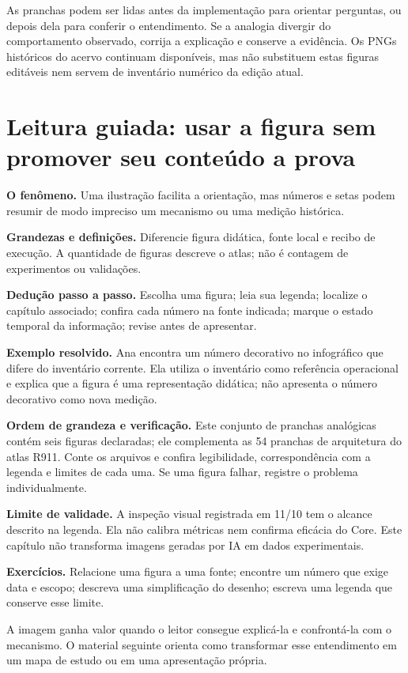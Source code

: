 As pranchas podem ser lidas antes da implementação para orientar perguntas, ou
depois dela para conferir o entendimento. Se a analogia divergir do comportamento
observado, corrija a explicação e conserve a evidência. Os PNGs históricos do
acervo continuam disponíveis, mas não substituem estas figuras editáveis nem
servem de inventário numérico da edição atual.

\section[Leitura guiada]{Leitura guiada: usar a figura sem promover seu conteúdo a prova}
\begin{descricao}
\textbf{O fenômeno.} Uma ilustração facilita a orientação, mas números e setas podem resumir de modo impreciso um mecanismo ou uma medição histórica.
\end{descricao}
\begin{definicao}
\textbf{Grandezas e definições.} Diferencie figura didática, fonte local e recibo de execução. A quantidade de figuras descreve o atlas; não é contagem de experimentos ou validações.
\end{definicao}
\begin{metodo}
\textbf{Dedução passo a passo.} Escolha uma figura; leia sua legenda; localize o capítulo associado; confira cada número na fonte indicada; marque o estado temporal da informação; revise antes de apresentar.
\end{metodo}
\begin{resultado}
\textbf{Exemplo resolvido.} Ana encontra um número decorativo no infográfico que difere do inventário corrente. Ela utiliza o inventário como referência operacional e explica que a figura é uma representação didática; não apresenta o número decorativo como nova medição.
\end{resultado}
\begin{resultado}
\textbf{Ordem de grandeza e verificação.} Este conjunto de pranchas analógicas contém seis figuras declaradas; ele complementa as 54 pranchas de arquitetura do atlas R911. Conte os arquivos e confira legibilidade, correspondência com a legenda e limites de cada uma. Se uma figura falhar, registre o problema individualmente.
\end{resultado}
\begin{aviso}
\textbf{Limite de validade.} A inspeção visual registrada em 11/10 tem o alcance descrito na legenda. Ela não calibra métricas nem confirma eficácia do Core. Este capítulo não transforma imagens geradas por IA em dados experimentais.
\end{aviso}
\begin{resultado}
\textbf{Exercícios.} Relacione uma figura a uma fonte; encontre um número que exige data e escopo; descreva uma simplificação do desenho; escreva uma legenda que conserve esse limite.
\end{resultado}

A imagem ganha valor quando o leitor consegue explicá-la e confrontá-la com o mecanismo. O material seguinte orienta como transformar esse entendimento em um mapa de estudo ou em uma apresentação própria.
